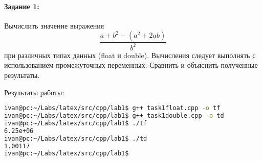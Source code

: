 \paragraph{Задание 1:}
Вычислить значение выражения
\[\frac{{a+b}^2-(a^2+2ab)}{b^2}\]
при различных типах данных (float и double).
Вычисления следует выполнять с использованием промежуточных переменных.
Сравнить и объяснить полученные результаты.




Результаты работы:

\begin{lstlisting}[label={lst:bashresults}, language=bash]
ivan@pc:~/Labs/latex/src/cpp/lab1$ g++ task1float.cpp -o tf
ivan@pc:~/Labs/latex/src/cpp/lab1$ g++ task1double.cpp -o td
ivan@pc:~/Labs/latex/src/cpp/lab1$ ./tf
6.25e+06
ivan@pc:~/Labs/latex/src/cpp/lab1$ ./td
1.00117
ivan@pc:~/Labs/latex/src/cpp/lab1$
\end{lstlisting}